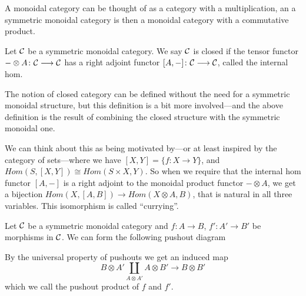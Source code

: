 A monoidal category can be thought of as a category with a multiplication, an a symmetric monoidal category is then a monoidal category with a commutative product. 

\begin{definition}
Let $\mathcal{C}$ be a symmetric monoidal category. We say $\mathcal{C}$ is closed if the tensor functor $-\otimes A\colon \mathcal{C} \longrightarrow \mathcal{C}$ has a right adjoint functor $[A, -]\colon \mathcal{C} \longrightarrow \mathcal{C}$, called the internal hom. 
\end{definition}

The notion of closed category can be defined without the need for a symmetric monoidal structure, but this definition is a bit more involved---and the above definition is the result of combining the closed structure with the symmetric monoidal one. 

We can think about this as being motivated by---or at least inspired by the category of sets---where we have $[X,Y]=\{ f:X\longrightarrow Y\}$, and $Hom(S, [X, Y])\cong Hom(S\times X, Y)$. So when we require that the internal hom functor $[A,-]$ is a right adjoint to the monoidal product functor $-\otimes A$, we get a bijection $Hom(X, [A, B])\longrightarrow Hom(X\otimes A, B)$, that is natural in all three variables. This isomorphism is called ``currying''.

\begin{definition}
Let $\mathcal{C}$ be a symmetric monoidal category and $f\colon A\longrightarrow B$, $f'\colon A'\longrightarrow B'$ be morphisms in $\mathcal{C}$. We can form the following pushout diagram
\begin{center}
\end{center}
By the universal property of pushouts we get an induced map
\begin{equation*}
    B\otimes A' \coprod_{A\otimes A'} A\otimes B' \longrightarrow B\otimes B'
\end{equation*}
which we call the pushout product of $f$ and $f'$. 
\end{definition}

